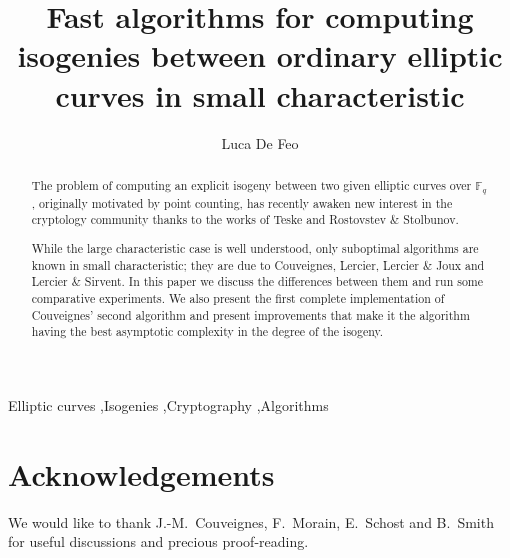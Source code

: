 \documentclass[preprint,1p]{elsarticle}
\newcommand{\F}{\mathbb{F}}  %
\newcommand{\0}{\mathcal{O}}  %
\begin{document}
\begin{frontmatter}

\title{Fast algorithms for computing isogenies between ordinary
  elliptic curves in small characteristic}
\author{Luca De Feo}
\address{LIX, {\'E}cole Polytechnique, 91128 Palaiseau, France}


\begin{abstract}
  The problem of computing an explicit isogeny between two given
  elliptic curves over $\F_q$, originally motivated by point counting,
  has recently awaken new interest in the cryptology community thanks
  to the works of Teske and Rostovstev \& Stolbunov.

  While the large characteristic case is well understood, only
  suboptimal algorithms are known in small characteristic; they are
  due to Couveignes, Lercier, Lercier \& Joux and Lercier \& Sirvent.
  In this paper we discuss the differences between them and run some
  comparative experiments. We also present the first complete
  implementation of Couveignes' second algorithm and present
  improvements that make it the algorithm having the best asymptotic
  complexity in the degree of the isogeny.
\end{abstract}

\begin{keyword}
  Elliptic curves \sep Isogenies \sep Cryptography \sep Algorithms
\end{keyword}

\end{frontmatter}







%



\section*{Acknowledgements}
We would like to thank J.-M.~Couveignes, F.~Morain, E.~Schost and
B.~Smith for useful discussions and precious proof-reading.


\end{document}
